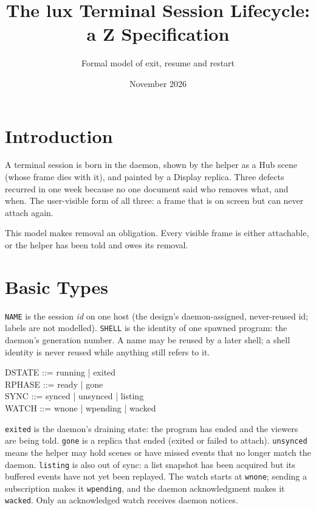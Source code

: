 \documentclass[a4paper,10pt,fleqn]{article}
\begin{document}
\title{The lux Terminal Session Lifecycle: a Z Specification}
\author{Formal model of exit, resume and restart}
\date{November 2026}
\maketitle

\section{Introduction}

A terminal session is born in the daemon, shown by the helper as a Hub
scene (whose frame dies with it), and painted by a Display replica.
Three defects recurred in one week because no one document said who
removes what, and when.  The user-visible form of all three: a frame
that is on screen but can never attach again.

This model makes removal an obligation.  Every visible frame is either
attachable, or the helper has been told and owes its removal.

\section{Basic Types}

\begin{zed}
\end{zed}

\texttt{NAME} is the session \emph{id} on one host (the design's daemon-assigned, never-reused id; labels are not modelled).  \texttt{SHELL} is the
identity of one spawned program: the daemon's generation number.  A name
may be reused by a later shell; a shell identity is never reused while
anything still refers to it.

\begin{zed}
  DSTATE ::= running | exited \\
  RPHASE ::= ready | gone \\
  SYNC ::= synced | unsynced | listing \\
  WATCH ::= wnone | wpending | wacked
\end{zed}

\texttt{exited} is the daemon's draining state: the program has ended
and the viewers are being told.  \texttt{gone} is a replica that ended
(exited or failed to attach).  \texttt{unsynced} means the helper may
hold scenes or have missed events that no longer match the daemon.
\texttt{listing} is also out of sync: a list snapshot has been acquired
but its buffered events have not yet been replayed. The watch starts at
\texttt{wnone}; sending a subscription makes it \texttt{wpending}, and
the daemon acknowledgment makes it \texttt{wacked}. Only an acknowledged
watch receives daemon notices.
\end{document}
